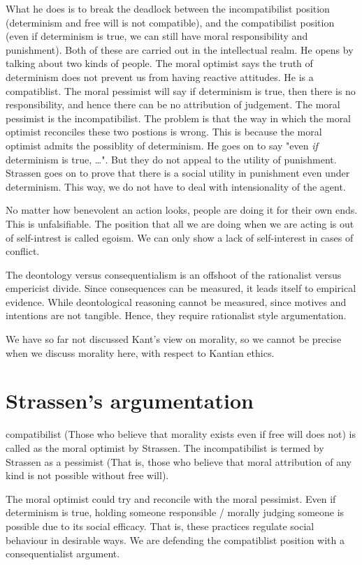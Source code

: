 \documentclass[11pt]{book}
\begin{document}
What he does is to break the deadlock between the incompatibilist position 
(determinism and free will is not compatible), and the compatibilist position
(even if determinism is true, we can still have moral responsibility and punishment).
Both of these are carried out in the intellectual realm. He opens
by talking about two kinds of people. The moral optimist says the truth of
determinism does not prevent us from having reactive attitudes. He is
a compatiblist. The moral pessimist will say if determinism is true, then there
is no responsibility, and hence there can be no attribution of judgement. The
moral pessimist is the incompatibilist. The problem is that the way in which
the moral optimist reconciles these two postions is wrong. This is because the
moral optimist admits the possiblity of determinism. He goes on to say
"even \emph{if} determinism is true, \dots". But they do not appeal to the utility
of punishment.  Strassen goes on to prove that there is a social utility in
punishment even under determinism. This way, we do not have to deal with
intensionality of the agent. 

No matter how benevolent an action looks, people are doing it for their
own ends. This is unfalsifiable.  The position that all we are doing when we
are acting is out of self-intrest is called egoism. We can only show a
lack of self-interest in cases of conflict.

The deontology versus consequentialism is an offshoot of the rationalist versus
empericist divide. Since consequences can be measured, it leads itself to
empirical evidence. While deontological reasoning cannot be measured, since
motives and intentions are not tangible. Hence, they
require rationalist style argumentation.

We have so far not discussed Kant's view on morality, so we cannot be precise
when we discuss morality here, with respect to Kantian ethics.

\section{Strassen's argumentation}

compatibilist (Those who believe that morality exists even if free will does not)
is called as the moral optimist by Strassen. The incompatibilist is termed by Strassen as
a pessimist (That is, those who believe that moral attribution of any kind 
is not possible without free will).

The moral optimist could try and reconcile with the moral pessimist. Even
if determinism is true, holding someone responsible / morally judging someone
is possible due to its social efficacy. That is, these practices regulate
social behaviour in desirable ways. We are defending the compatiblist position
with a consequentialist argument. 
\end{document}
